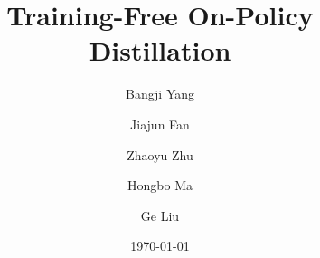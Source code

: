 \documentclass[]{uiuc_paper}
\title{Training-Free On-Policy Distillation}
\author[1,*]{Bangji Yang}
\author[1,*]{Jiajun Fan}
\author[1]{Zhaoyu Zhu}
\author[2]{Hongbo Ma}
\author[1,\textdagger]{Ge Liu}
\affiliation[1]{University of Illinois at Urbana-Champaign}
\affiliation[2]{Tsinghua University}
\date{\today}
\begin{document}
\newtheorem{theorem}{Theorem}[section]
\newtheorem{proposition}[theorem]{Proposition}
\newtheorem{lemma}[theorem]{Lemma}
\newtheorem{corollary}[theorem]{Corollary}
\newtheorem{definition}[theorem]{Definition}
\newtheorem{assumption}[theorem]{Assumption}
\newtheorem{remark}[theorem]{Remark}

\maketitle







\clearpage



\clearpage
\appendix

\end{document}
